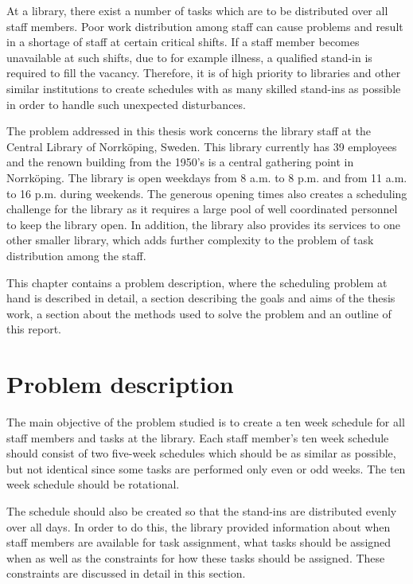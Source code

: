 
At a library, there exist a number of tasks which are to be distributed over all staff members. Poor work distribution among staff can cause problems and result in a shortage of staff at certain critical shifts. If a staff member becomes unavailable at such shifts, due to for example illness, a qualified stand-in is required to fill the vacancy. Therefore, it is of high priority to libraries and other similar institutions to create schedules with as many skilled stand-ins as possible in order to handle such unexpected disturbances. 

The problem addressed in this thesis work concerns the library staff at the Central Library of Norrköping, Sweden. This library currently has 39 employees and the renown building from the 1950's is a central gathering point in Norrköping. The library is open weekdays from 8 a.m. to 8 p.m. and from 11 a.m. to 16 p.m. during weekends. The generous opening times also creates a scheduling challenge for the library as it requires a large pool of well coordinated personnel to keep the library open. In addition, the library also provides its services to one other smaller library, which adds further complexity to the problem of task distribution among the staff.

This chapter contains a problem description, where the scheduling problem at hand is described in detail, a section describing the goals and aims of the thesis work, a section about the methods used to solve the problem and an outline of this report.

\section{Problem description} \label{problem_description}

The main objective of the problem studied is to create a ten week schedule for all staff members and tasks at the library. Each staff member's ten week schedule should consist of two five-week schedules which should be as similar as possible, but not identical since some tasks are performed only even or odd weeks. The ten week schedule should be rotational.

The schedule should also be created so that the stand-ins are distributed evenly over all days. In order to do this, the library provided information about when staff members are available for task assignment, what tasks should be assigned when as well as the constraints for how these tasks should be assigned. These constraints are discussed in detail in this section.

